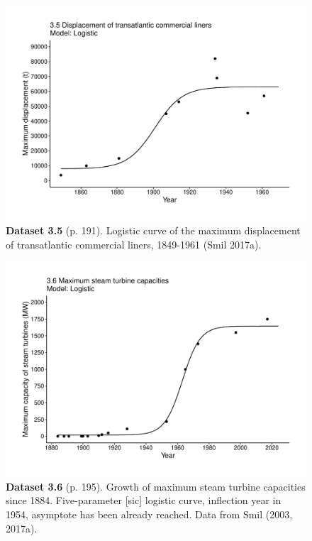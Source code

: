 \documentclass[aps,rmp,preprint,superscriptaddress,10pt,onecolumn]{article}
\begin{document}
\clearpage
\begin{figure}[h]
\includegraphics[width=\textwidth]{output/figs-ggplot/3.5.pdf}
\caption*{\textbf{Dataset 3.5} (p. 191). Logistic curve of the maximum displacement of transatlantic commercial liners, 1849-1961 (Smil 2017a).}
\end{figure}
	
\clearpage
\begin{figure}[h]
\includegraphics[width=\textwidth]{output/figs-ggplot/3.6.pdf}
\caption*{\textbf{Dataset 3.6} (p. 195). Growth of maximum steam turbine capacities since 1884. Five-parameter [sic] logistic curve, inflection year in 1954, asymptote has been already reached. Data from Smil (2003, 2017a).}
\end{figure}
	
\end{document}
